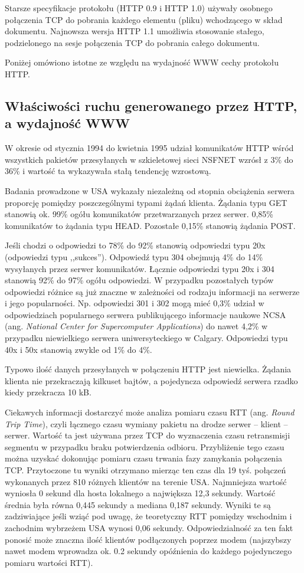 Starsze specyfikacje protokołu (HTTP 0.9 i HTTP 1.0) używały osobnego połączenia TCP do pobrania każdego 
elementu (pliku) wchodzącego w skład dokumentu. Najnowsza wersja HTTP 1.1 umożliwia stosowanie stałego, 
podzielonego na sesje połączenia TCP do pobrania całego dokumentu.

Poniżej omówiono istotne ze względu na wydajność WWW cechy protokołu HTTP.

\subsection{Właściwości ruchu generowanego przez HTTP, a wydajność WWW}

W okresie od stycznia 1994 do kwietnia 1995 udział komunikatów HTTP wśród wszystkich pakietów przesyłanych 
w szkieletowej sieci NSFNET wzrósł z 3\% do 36\% i wartość ta wykazywała stałą tendencję wzrostową. 

Badania prowadzone w USA wykazały niezależną od stopnia obciążenia serwera proporcję pomiędzy 
poszczególnymi typami żądań klienta. Żądania typu GET stanowią ok. 99\% ogółu komunikatów przetwarzanych przez 
serwer. 0,85\% komunikatów to żądania typu HEAD. Pozostałe 0,15\% stanowią żądania POST. 

Jeśli chodzi o odpowiedzi to 78\% do 92\% stanowią odpowiedzi typu 20x (odpowiedzi typu ,,sukces''). Odpowiedź typu 
304 obejmują 4\% do 14\% wysyłanych przez serwer komunikatów. Łącznie odpowiedzi typu 20x i 304 stanowią 92\% do 
97\% ogółu odpowiedzi. W przypadku pozostałych typów odpowiedzi różnice są już znaczne w zależności od rodzaju 
informacji na serwerze i jego popularności. Np. odpowiedzi 301 i 302 mogą mieć 0,3\% udział w odpowiedziach 
popularnego serwera publikującego informacje naukowe NCSA (ang. \emph{National Center for Supercomputer Applications}) 
do nawet 4,2\% w przypadku niewielkiego serwera uniwersyteckiego w Calgary. Odpowiedzi typu 40x i 50x stanowią 
zwykle od 1\% do 4\%. 

Typowo ilość danych przesyłanych w połączeniu HTTP jest niewielka. Żądania klienta nie przekraczają kilkuset 
bajtów, a pojedyncza odpowiedź serwera rzadko kiedy przekracza 10 kB.

Ciekawych informacji dostarczyć może analiza pomiaru czasu RTT (ang. \emph{Round Trip Time}), czyli łącznego czasu 
wymiany pakietu na drodze serwer -- klient -- serwer. Wartość ta jest używana przez TCP do wyznaczenia czasu 
retransmisji segmentu w przypadku braku potwierdzenia odbioru. Przybliżenie tego czasu można uzyskać dokonując 
pomiaru czasu trwania fazy zamykania połączenia TCP. Przytoczone tu wyniki otrzymano mierząc ten czas dla 19 
tyś. połączeń wykonanych przez 810 różnych klientów na terenie USA. Najmniejsza wartość wyniosła 0 sekund dla 
hosta lokalnego a największa 12,3 sekundy. Wartość średnia była równa 0,445 sekundy a mediana 0,187 sekundy. 
Wyniki te są zadziwiające jeśli wziąć pod uwagę, że teoretyczny RTT pomiędzy wschodnim i zachodnim wybrzeżem USA 
wynosi 0,06 sekundy. Odpowiedzialność za ten fakt ponosić może znaczna ilość klientów podłączonych poprzez modem 
(najszybszy nawet modem wprowadza ok. 0.2 sekundy opóźnienia do każdego pojedynczego pomiaru wartości RTT). 

